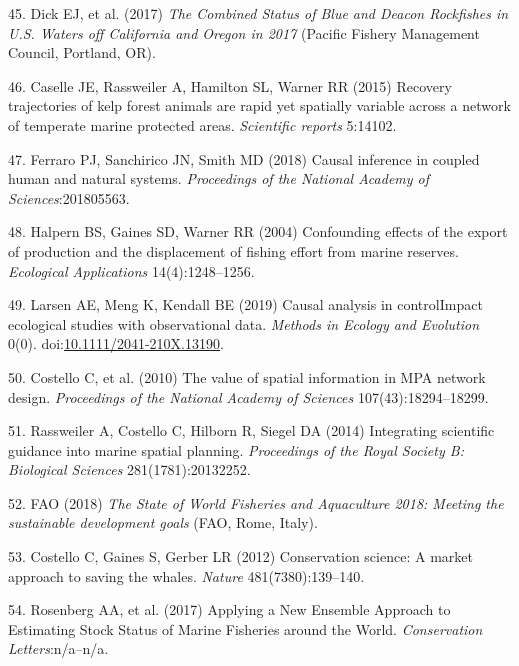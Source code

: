 \documentclass[9pt,twocolumn,twoside,lineno]{pnas-new}
\begin{document}
\leavevmode\hypertarget{ref-dick2017}{}%
45. Dick EJ, et al. (2017) \emph{The Combined Status of Blue and Deacon
Rockfishes in U.S. Waters off California and Oregon in 2017} (Pacific
Fishery Management Council, Portland, OR).

\leavevmode\hypertarget{ref-caselle2015}{}%
46. Caselle JE, Rassweiler A, Hamilton SL, Warner RR (2015) Recovery
trajectories of kelp forest animals are rapid yet spatially variable
across a network of temperate marine protected areas. \emph{Scientific
reports} 5:14102.

\leavevmode\hypertarget{ref-ferraro2018}{}%
47. Ferraro PJ, Sanchirico JN, Smith MD (2018) Causal inference in
coupled human and natural systems. \emph{Proceedings of the National
Academy of Sciences}:201805563.

\leavevmode\hypertarget{ref-halpern2004}{}%
48. Halpern BS, Gaines SD, Warner RR (2004) Confounding effects of the
export of production and the displacement of fishing effort from marine
reserves. \emph{Ecological Applications} 14(4):1248--1256.

\leavevmode\hypertarget{ref-larsen2019}{}%
49. Larsen AE, Meng K, Kendall BE (2019) Causal analysis in
controlImpact ecological studies with observational data. \emph{Methods
in Ecology and Evolution} 0(0).
doi:\href{https://doi.org/10.1111/2041-210X.13190}{10.1111/2041-210X.13190}.

\leavevmode\hypertarget{ref-costello2010d}{}%
50. Costello C, et al. (2010) The value of spatial information in MPA
network design. \emph{Proceedings of the National Academy of Sciences}
107(43):18294--18299.

\leavevmode\hypertarget{ref-rassweiler2014}{}%
51. Rassweiler A, Costello C, Hilborn R, Siegel DA (2014) Integrating
scientific guidance into marine spatial planning. \emph{Proceedings of
the Royal Society B: Biological Sciences} 281(1781):20132252.

\leavevmode\hypertarget{ref-fao2018}{}%
52. FAO (2018) \emph{The State of World Fisheries and Aquaculture 2018:
Meeting the sustainable development goals} (FAO, Rome, Italy).

\leavevmode\hypertarget{ref-costello2012}{}%
53. Costello C, Gaines S, Gerber LR (2012) Conservation science: A
market approach to saving the whales. \emph{Nature} 481(7380):139--140.

\leavevmode\hypertarget{ref-rosenberg2017}{}%
54. Rosenberg AA, et al. (2017) Applying a New Ensemble Approach to
Estimating Stock Status of Marine Fisheries around the World.
\emph{Conservation Letters}:n/a--n/a.
\end{document}
